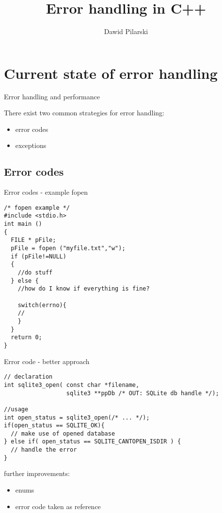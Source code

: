 \documentclass[10pt,a4paper]{beamer}
\date{}
\author{Dawid Pilarski}
\title{Error handling in C++}
\begin{document}
\begin{frame}
	\titlepage
\end{frame}

\begin{frame}
	\tableofcontents
\end{frame}

\section{Current state of error handling}
\begin{frame}{Error handling and performance}
	
	There exist two common strategies for error handling:
	\begin{itemize}
		\item error codes
		\item exceptions
	\end{itemize}

\end{frame}

\subsection{Error codes}
\begin{frame}[fragile]{Error codes - example fopen}
	\begin{verbatim}
/* fopen example */
#include <stdio.h>
int main ()
{
  FILE * pFile;
  pFile = fopen ("myfile.txt","w");
  if (pFile!=NULL)
  {
    //do stuff
  } else {
    //how do I know if everything is fine?
    
    switch(errno){
    // 
    }
  }
  return 0;
}
	\end{verbatim}
\end{frame}


\begin{frame}[fragile]{Error code - better approach}
	\begin{verbatim}
// declaration
int sqlite3_open( const char *filename,
                  sqlite3 **ppDb /* OUT: SQLite db handle */);
	
//usage
int open_status = sqlite3_open(/* ... */);
if(open_status == SQLITE_OK){
  // make use of opened database
} else if( open_status == SQLITE_CANTOPEN_ISDIR ) {
  // handle the error
}
	\end{verbatim}


	\begin{block}{further improvements:}
		\begin{itemize}
			\item enums
			\item error code taken as reference
		\end{itemize}	
	\end{block}
\end{frame}
\end{document}
